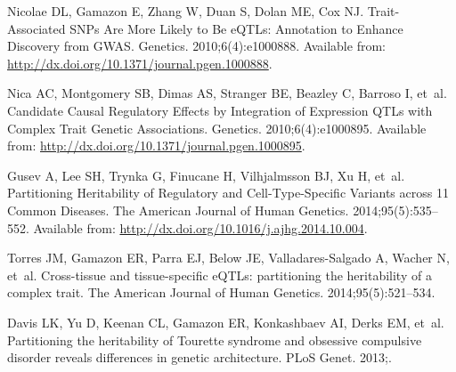 \documentclass[10pt,letterpaper]{article}
\begin{document}


\nolinenumbers

\begin{thebibliography}{10}

Nicolae DL, Gamazon E, Zhang W, Duan S, Dolan ME, Cox NJ.
\newblock Trait-Associated {SNPs} Are More Likely to Be {eQTLs}: Annotation to
  Enhance Discovery from {GWAS}.
 Genetics. 2010;6(4):e1000888.
\newblock Available from: \url{http://dx.doi.org/10.1371/journal.pgen.1000888}.

Nica AC, Montgomery SB, Dimas AS, Stranger BE, Beazley C, Barroso I, et~al.
\newblock Candidate Causal Regulatory Effects by Integration of Expression
  {QTLs} with Complex Trait Genetic Associations.
 Genetics. 2010;6(4):e1000895.
\newblock Available from: \url{http://dx.doi.org/10.1371/journal.pgen.1000895}.

Gusev A, Lee SH, Trynka G, Finucane H, Vilhjalmsson BJ, Xu H, et~al.
\newblock Partitioning Heritability of Regulatory and Cell-Type-Specific
  Variants across 11 Common Diseases.
\newblock The American Journal of Human Genetics. 2014;95(5):535--552.
\newblock Available from: \url{http://dx.doi.org/10.1016/j.ajhg.2014.10.004}.

Torres JM, Gamazon ER, Parra EJ, Below JE, Valladares-Salgado A, Wacher N,
  et~al.
\newblock Cross-tissue and tissue-specific eQTLs: partitioning the heritability
  of a complex trait.
\newblock The American Journal of Human Genetics. 2014;95(5):521--534.

Davis LK, Yu D, Keenan CL, Gamazon ER, Konkashbaev AI, Derks EM, et~al.
\newblock Partitioning the heritability of Tourette syndrome and obsessive
  compulsive disorder reveals differences in genetic architecture.
\newblock PLoS Genet. 2013;.


\end{thebibliography}
\end{document}
